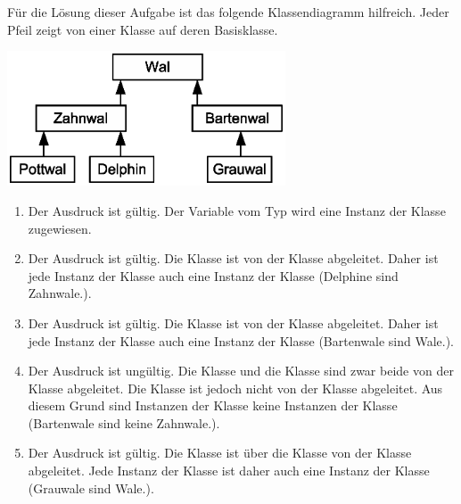 \begin{frame}[t]%
F\"ur die L\"osung dieser Aufgabe ist das folgende Klassendiagramm hilfreich.
Jeder Pfeil zeigt von einer Klasse auf deren Basisklasse.
\begin{center}
\includegraphics[height=4cm]{klassen-hierarchie/wale}
\end{center}
\end{frame}

\begin{frame}[t]%

\begin{enumerate}
\item
  Der Ausdruck ist g\"ultig.
  Der Variable  vom Typ  wird eine Instanz der Klasse  zugewiesen.
\item
  Der Ausdruck ist g\"ultig.
  Die Klasse  ist von der Klasse  abgeleitet.
  Daher ist jede Instanz der Klasse  auch eine Instanz der Klasse  (\glqq Delphine sind Zahnwale.\grqq).
\item
  Der Ausdruck ist g\"ultig.
  Die Klasse  ist von der Klasse  abgeleitet.
  Daher ist jede Instanz der Klasse  auch eine Instanz der Klasse  (\glqq Bartenwale sind Wale.\grqq).
\item
  Der Ausdruck ist ung\"ultig.
  Die Klasse  und die Klasse  sind zwar beide von der Klasse  abgeleitet.
  Die Klasse  ist jedoch nicht von der Klasse  abgeleitet.
  Aus diesem Grund sind Instanzen der Klasse  keine Instanzen der Klasse  (\glqq Bartenwale sind keine Zahnwale.\grqq).
\item
  Der Ausdruck ist g\"ultig.
  Die Klasse  ist \"uber die Klasse  von der Klasse  abgeleitet.
  Jede Instanz der Klasse  ist daher auch eine Instanz der Klasse  (\glqq Grauwale sind Wale.\grqq).
\end{enumerate}
\end{frame}

